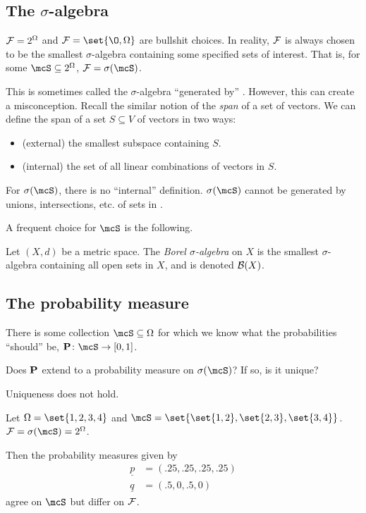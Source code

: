 \subsection{The $\sigma$-algebra}
$\F = 2^\Omega$ and $\F = \set{\O, \Omega}$ are bullshit choices.
In reality, $\F$ is always chosen to be the smallest $\sigma$-algebra
containing some specified sets of interest.
That is, for some $\mcS \subseteq 2^\Omega$, $\F = \sigma(\mcS)$.

This is sometimes called the $\sigma$-algebra ``generated by'' \mcS.
However, this can create a misconception.
Recall the similar notion of the \emph{span} of a set of vectors.
We can define the span of a set $S \subseteq V$ of vectors in two ways:
\begin{itemize}
    \item (external) the smallest subspace containing $S$.
    \item (internal) the set of all linear combinations of vectors in $S$.
\end{itemize}
For $\sigma(\mcS)$, there is no ``internal'' definition.
$\sigma(\mcS)$ cannot be generated by unions, intersections, etc. of sets in
\mcS.

A frequent choice for $\mcS$ is the following.
\begin{definition*} \label{def:borel}
    Let $(X, d)$ be a metric space.
    The \emph{Borel $\sigma$-algebra} on $X$ is the smallest
    $\sigma$-algebra containing all open sets in $X$, and is denoted
    $\B(X)$.
\end{definition*}

\subsection{The probability measure}
There is some collection $\mcS \subseteq \Omega$ for which we know what
the probabilities ``should'' be, $\P\colon \mcS \to [0, 1]$.

\begin{question}
    Does $\P$ extend to a probability measure on
    $\sigma(\mcS)$? If so, is it unique?
\end{question}

Uniqueness does not hold.
\begin{example}
    Let $\Omega = \set{1, 2, 3, 4}$ and
    $\mcS = \set{\set{1, 2}, \set{2, 3}, \set{3, 4}}$.
    $\F = \sigma(\mcS) = 2^\Omega$.

    Then the probability measures given by \begin{align*}
        \underline{p} &= (.25, .25, .25, .25) \\
        \underline{q} &= (.5, 0, .5, 0)
    \end{align*} agree on $\mcS$ but differ on $\F$.
\end{example}

